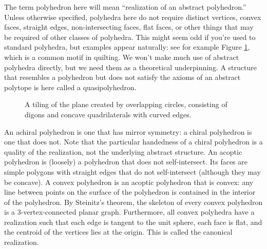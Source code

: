\documentclass{article}
\begin{document}
The term polyhedron here will mean ``realization of an abstract polyhedron.''
Unless otherwise specified, polyhedra here do not require distinct vertices,
convex faces, straight edges, non-intersecting faces, flat faces, or other
things that may be required of other classes of polyhedra. This might seem
odd if you're used to standard polyhedra, but examples appear naturally: see
for example Figure \ref{fig:circlesquare}, which is a common motif in quilting.
We won't make much
use of abstract polyhedra directly, but we need them as a theoretical
underpinning. A structure that resembles a polyhedron but does not satisfy the
axioms of an abstract polytope is here called a quasipolyhedron.
\begin{figure}

\caption{A tiling of the plane created by overlapping circles, consisting of
digons and concave quadrilaterals with curved edges.}
\label{fig:circlesquare}
\end{figure}

An achiral polyhedron is one that has mirror symmetry: a chiral polyhedron is
one that does not. Note that the particular handedness of a chiral polyhedron
is a quality of the realization, not the underlying abstract structure.
An acoptic polyhedron is (loosely) a polyhedron that does not
self-intersect. \cite{grunbaum2} Its faces are simple polygons with straight
edges that do not self-intersect (although they may be concave). A convex
polyhedron is an acoptic polyhedron that is convex: any line between points on
the surface of the polyhedron is contained in the interior of the polyhedron.
By Steinitz's theorem, the skeleton of every convex polyhedron is a
3-vertex-connected planar graph. Furthermore, all convex polyhedra have a
realization such that each edge is tangent to the unit sphere,
each face is flat, and the centroid of the vertices lies at the origin. This is
called the canonical realization.
\end{document}
